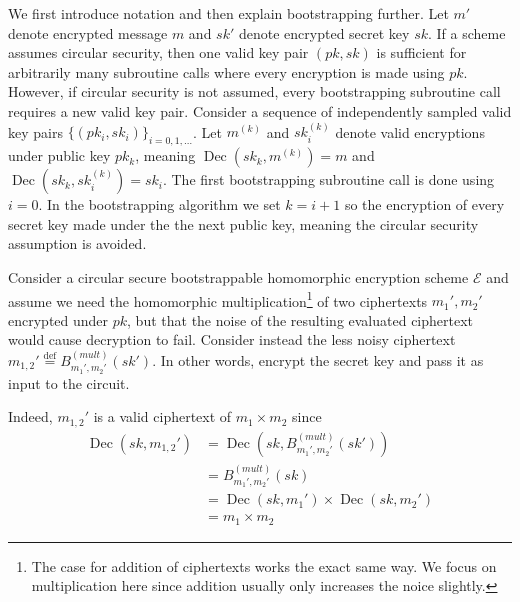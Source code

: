 We first introduce notation and then explain bootstrapping further. Let $m'$ denote encrypted message $m$ and $sk'$ denote encrypted secret key $sk$. If a scheme assumes circular security, then one valid key pair $(pk,sk)$ is sufficient for arbitrarily many subroutine calls where every encryption is made using $pk$. However, if circular security is not assumed, every bootstrapping subroutine call requires a new valid key pair. Consider a sequence of independently sampled valid key pairs $\{(pk_i,sk_i)\}_{i = 0, 1, \dots}$. Let $m^{(k)}$ and $sk_i^{(k)}$ denote valid encryptions under public key $pk_k$, meaning $\operatorname{Dec}(sk_k,m^{(k)}) = m$ and $\operatorname{Dec}(sk_k,sk_i^{(k)}) = sk_i$. The first bootstrapping subroutine call is done using $i = 0$. In the bootstrapping algorithm we set $k = i+1$ so the encryption of every secret key made under the the next public key, meaning the circular security assumption is avoided. 


Consider a circular secure bootstrappable homomorphic encryption scheme $\mathcal{E}$ and assume we need the homomorphic multiplication\footnote{The case for addition of ciphertexts works the exact same way. We focus on multiplication here since addition usually only increases the noice slightly.} of two ciphertexts $m_1', m_2'$ encrypted under $pk$, but that the noise of the resulting evaluated ciphertext would cause decryption to fail. Consider instead the less noisy ciphertext $m_{1,2}' \stackrel{\mathrm{def}}{=} B_{m_1',m_2'}^{(mult)}(sk')$. In other words, encrypt the secret key and pass it as input to the circuit.


Indeed, $m_{1,2}'$ is a valid ciphertext of $m_1 \times m_2$ since 
\begin{equation*}
    \begin{aligned}
        \operatorname{Dec}(sk, m_{1,2}') &= \operatorname{Dec}(sk, B_{m_1',m_2'}^{(mult)}(sk'))\\
        &= B_{m_1',m_2'}^{(mult)}(sk) \\
        &= \operatorname{Dec}(sk, m_1') \times \operatorname{Dec}(sk, m_2')\\
        &= m_1 \times m_2
    \end{aligned}
\end{equation*}

